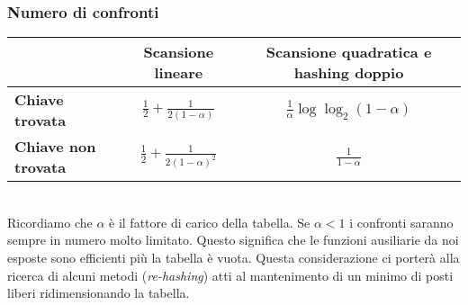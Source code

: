 \subsubsection{Numero di confronti}
\begin{tabular}{|l|c|c|}
    \hline
    \space & \textbf{Scansione lineare} & \textbf{Scansione quadratica e hashing doppio}\\
    \hline
    \textbf{Chiave trovata} & $\frac{1}{2} + \frac{1}{2(1-\alpha)}$ & $\frac{1}{\alpha} \log \log_2(1-\alpha)$\\
    \hline
    \textbf{Chiave non trovata} & $\frac{1}{2} + \frac{1}{2(1-\alpha)^2}$ & $\frac{1}{1-\alpha}$\\
    \hline
\end{tabular}\\
Ricordiamo che $\alpha$ è il fattore di carico della tabella.
Se $\alpha < 1$ i confronti saranno sempre in numero molto limitato.
Questo significa che le funzioni ausiliarie da noi esposte sono efficienti più la tabella è vuota.
Questa considerazione ci porterà alla ricerca di alcuni metodi (\emph{re-hashing}) atti 
al mantenimento di un minimo di posti liberi ridimensionando la tabella.
